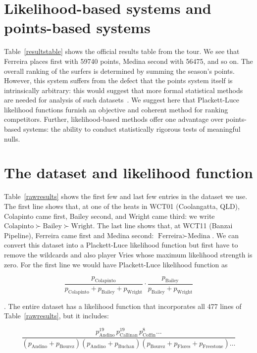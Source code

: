 \documentclass{article}
\begin{document}
\section{Likelihood-based systems and points-based systems}


Table~\ref{resultstable} shows the official results table from the
tour.  We see that Ferreira places first with 59740 points, Medina
second with 56475, and so on.  The overall ranking of the surfers is
determined by summing the season's points.  However, this system
suffers from the defect that the points system itself is intrinsically
arbitrary: this would suggest that more formal statistical methods are
needed for analysis of such datasets~\citep{aldous2017}.  We suggest
here that Plackett-Luce likelihood functions furnish an objective and
coherent method for ranking competitors.  Further, likelihood-based
methods offer one advantage over points-based systems: the ability to
conduct statistically rigorous tests of meaningful nulls.

\section{The dataset and likelihood function}

Table~\ref{rawresults} shows the first few and last few entries in the
dataset we use.  The first line shows that, at one of the heats in
WCT01 (Coolangatta, QLD), Colapinto came first, Bailey second, and
Wright came third: we write
$\mbox{Colapinto}\succ\mbox{Bailey}\succ\mbox{Wright}$.  The last line
shows that, at WCT11 (Banzai Pipeline), Ferreira came first and Medina
second: $\mbox{Ferreira}\succ\mbox{Medina}$.  We can convert this
dataset into a Plackett-Luce likelihood function but first have to
remove the wildcards and also player Vries whose maximum likelihood
strength is zero.  For the first line we would have Plackett-Luce
likelihood function as

\begin{equation}
\frac{p_\mathrm{Colapinto}}{p_\mathrm{Colapinto} + p_\mathrm{Bailey} + p_\mathrm{Wright}}\cdot
\frac{p_\mathrm{Bailey}}{p_\mathrm{Bailey} + p_\mathrm{Wright}}
\end{equation}

.  The entire dataset has a likelihood function
that incorporates all 477 lines of Table~\ref{rawresults}, but it
includes:

\begin{equation}\label{complete_likelihood_function}
\frac{
p_\mathrm{Andino}^{19}\, p_\mathrm{Callinan}^{19}\, p_\mathrm{Coffin}^{8}\ldots
}{
(p_\mathrm{Andino} + p_\mathrm{Bourez})  (p_\mathrm{Andino} + p_\mathrm{Buchan})(p_\mathrm{Bourez} + p_\mathrm{Flores} + p_\mathrm{Freestone})\ldots
}
\end{equation}
\end{document}

